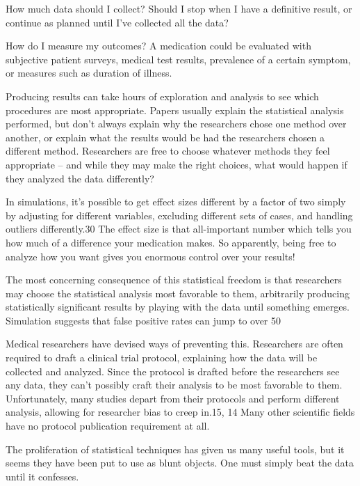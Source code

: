     How much data should I collect? Should I stop when I have a definitive result, or continue as planned until I’ve collected all the data?
    
    How do I measure my outcomes? A medication could be evaluated with subjective patient surveys, medical test results, prevalence of a certain symptom, or measures such as duration of illness.

Producing results can take hours of exploration and analysis to see which procedures are most appropriate. Papers usually explain the statistical analysis performed, but don’t always explain why the researchers chose one method over another, or explain what the results would be had the researchers chosen a different method. Researchers are free to choose whatever methods they feel appropriate – and while they may make the right choices, what would happen if they analyzed the data differently?

In simulations, it’s possible to get effect sizes different by a factor of two simply by adjusting for different variables, excluding different sets of cases, and handling outliers differently.30 The effect size is that all-important number which tells you how much of a difference your medication makes. So apparently, being free to analyze how you want gives you enormous control over your results!

The most concerning consequence of this statistical freedom is that researchers may choose the statistical analysis most favorable to them, arbitrarily producing statistically significant results by playing with the data until something emerges. Simulation suggests that false positive rates can jump to over 50%

Medical researchers have devised ways of preventing this. Researchers are often required to draft a clinical trial protocol, explaining how the data will be collected and analyzed. Since the protocol is drafted before the researchers see any data, they can’t possibly craft their analysis to be most favorable to them. Unfortunately, many studies depart from their protocols and perform different analysis, allowing for researcher bias to creep in.15, 14 Many other scientific fields have no protocol publication requirement at all.

The proliferation of statistical techniques has given us many useful tools, but it seems they have been put to use as blunt objects. One must simply beat the data until it confesses.